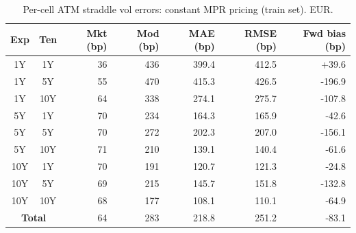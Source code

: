 \begin{table}[H]
\centering
\caption{Per-cell ATM straddle vol errors: constant MPR pricing (train set). EUR.}
\label{tab:constant_mpr_consistent_per_cell_train}
\small
\begin{tabular}{@{}ccrrrrr@{}}
\toprule
\textbf{Exp} & \textbf{Ten} & \textbf{Mkt (bp)} & \textbf{Mod (bp)} & \textbf{MAE (bp)} & \textbf{RMSE (bp)} & \textbf{Fwd bias (bp)} \\
\midrule
  1Y & 1Y & 36 & 436 & 399.4 & 412.5 & +39.6 \\
  1Y & 5Y & 55 & 470 & 415.3 & 426.5 & -196.9 \\
  1Y & 10Y & 64 & 338 & 274.1 & 275.7 & -107.8 \\
  \midrule
  5Y & 1Y & 70 & 234 & 164.3 & 165.9 & -42.6 \\
  5Y & 5Y & 70 & 272 & 202.3 & 207.0 & -156.1 \\
  5Y & 10Y & 71 & 210 & 139.1 & 140.4 & -61.6 \\
  \midrule
  10Y & 1Y & 70 & 191 & 120.7 & 121.3 & -24.8 \\
  10Y & 5Y & 69 & 215 & 145.7 & 151.8 & -132.8 \\
  10Y & 10Y & 68 & 177 & 108.1 & 110.1 & -64.9 \\
  \midrule
  \multicolumn{2}{c}{\textbf{Total}} & 64 & 283 & 218.8 & 251.2 & -83.1 \\
\bottomrule
\end{tabular}
\end{table}